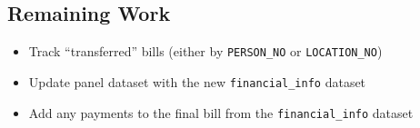 \documentclass[11pt]{article}
\begin{document}
\subsection*{Remaining Work}

\begin{itemize}
	\item Track ``transferred'' bills (either by \texttt{PERSON\_NO} or \texttt{LOCATION\_NO})
	\item Update panel dataset with the new \texttt{financial\_info} dataset
	\item Add any payments to the final bill from the \texttt{financial\_info} dataset
\end{itemize}
\end{document}
